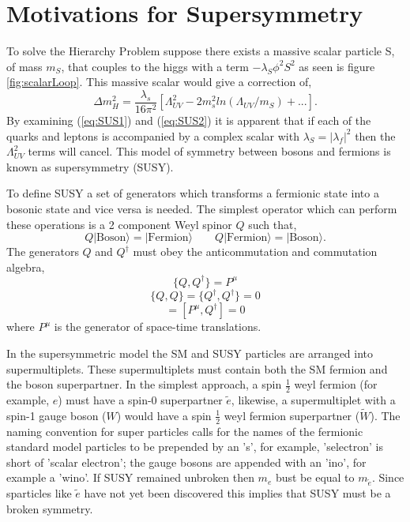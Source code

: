 \section{Motivations for Supersymmetry}
To solve the Hierarchy Problem suppose there exists a massive scalar particle S, 
of mass $m_{S}$, that couples
to the higgs with a term $-\lambda_{S}\phi^{2} S^{2}$ as seen is 
figure \ref{fig:scalarLoop}. This massive scalar would give a correction of,
\begin{equation}
\Delta m_{H}^{2}=\frac{\lambda_{s}}{16\pi^{2}}\left[\Lambda_{UV}^{2}-2m_{s}^{2}ln(\Lambda_{UV}/m_{S})+... \right].
\label{eq:SUS2}
\end{equation}
By examining (\ref{eq:SUS1}) and (\ref{eq:SUS2}) it is apparent that if each of the quarks
and leptons is accompanied by a complex scalar with $\lambda_{S}=|\lambda_{f}|^{2}$  %
then the $\Lambda_{UV}^{2}$ terms will cancel. This model of symmetry between bosons
and fermions is known as supersymmetry (SUSY).


To define SUSY a set of generators which 
transforms a fermionic state into a bosonic state and vice versa is needed. The simplest 
operator which can perform these operations is a 2 component Weyl spinor $Q$
such that,
\begin{equation}
Q|\mathrm{Boson}\rangle=|\mathrm{Fermion}\rangle \qquad Q|\mathrm{Fermion}\rangle=|\mathrm{Boson}\rangle.
\end{equation}
The generators $Q$ and $Q^{\dagger}$ must obey the anticommutation
and commutation algebra,
\begin{equation}
\{Q,Q^{\dagger}\}=P^{\mu}
\end{equation}
\begin{equation}
\{Q,Q\}=\{Q^{\dagger},Q^{\dagger}\}=0
\end{equation}
\begin{equation}
[P^{\mu},Q ]=[P^{\mu},Q^{\dagger}]=0
\end{equation}
where $P^{\mu}$ is the generator of space-time translations.

In the supersymmetric model the SM and SUSY particles are arranged
into supermultiplets. These supermultiplets must contain both the SM fermion
and the boson superpartner. In the simplest approach, a  spin $\frac{1}{2}$
weyl fermion (for example, $e$) must have %
a spin-0 superpartner $\tilde{e}$, likewise, a supermultiplet with a spin-1 gauge boson ($W$) would have
 a spin $\frac{1}{2}$ weyl fermion superpartner ($\tilde{W}$).
The naming convention for super particles calls for the names of
the fermionic standard model particles to be prepended by an 's', for example, 
'selectron' is short of 'scalar electron'; the gauge bosons are appended
with an 'ino', for example a 'wino'. If SUSY remained unbroken
then $m_{e}$ bust be equal to $m_{\tilde{e}}$. Since sparticles like $\tilde{e}$ have not 
yet been discovered this implies that SUSY must be a broken
symmetry.
